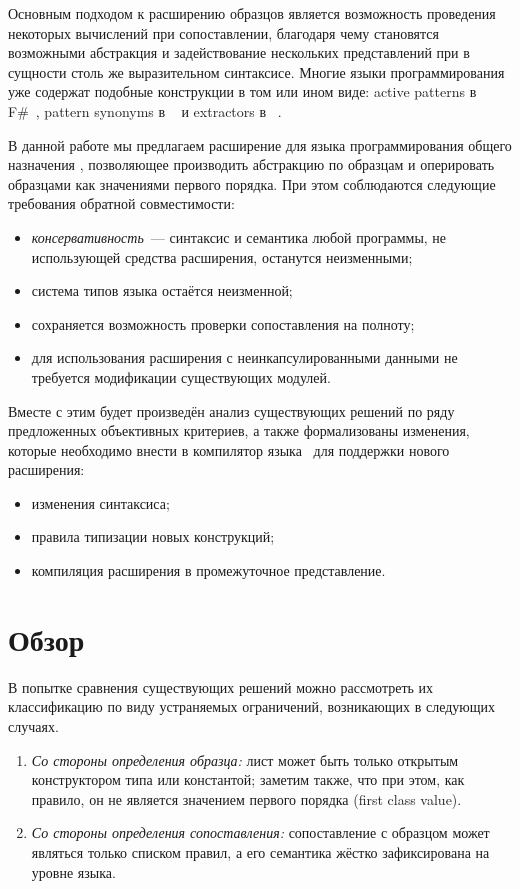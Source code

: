 Основным подходом к расширению образцов является возможность проведения некоторых вычислений при сопоставлении, благодаря чему становятся возможными абстракция и задействование нескольких представлений при в сущности столь же выразительном синтаксисе. Многие языки программирования уже содержат подобные конструкции в том или ином виде: active patterns в F\#~\cite{syme2007extensible}, pattern synonyms в \Haskell~\cite{pickering2016pattern} и extractors в \Scala~\cite{emir2007objects}. 

В данной работе мы предлагаем расширение для языка программирования общего назначения \ocaml, позволяющее производить абстракцию по образцам и оперировать образцами как значениями первого порядка. При этом соблюдаются следующие требования обратной совместимости:

\begin{itemize}
  \item \textit{консервативность}~--- синтаксис и семантика любой программы, не использующей средства расширения, останутся неизменными;
  \item система типов языка остаётся неизменной;
  \item сохраняется возможность проверки сопоставления на полноту;
  \item для использования расширения с неинкапсулированными данными не требуется модификации существующих модулей.
\end{itemize}

\noindent Вместе с этим будет произведён анализ существующих решений по ряду предложенных объективных критериев, а также формализованы изменения, которые необходимо внести в компилятор языка \ocaml~для поддержки нового расширения:
  
\begin{itemize}
\item изменения синтаксиса;
\item правила типизации новых конструкций;
\item компиляция расширения в промежуточное представление.
\end{itemize}

\section{Обзор}
В попытке сравнения существующих решений можно рассмотреть их классификацию по виду устраняемых ограничений, возникающих в следующих случаях. 

\begin{enumerate}
	\item \textit{Со стороны определения образца:} лист может быть только открытым конструктором типа или константой; заметим также, что при этом, как правило, он не является значением первого порядка (first class value).
	\item \textit{Со стороны определения сопоставления:} сопоставление с образцом может являться только списком правил, а его семантика жёстко зафиксирована на уровне языка.
\end{enumerate}

